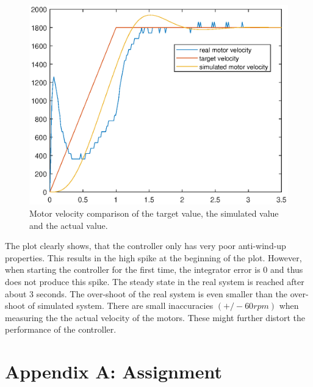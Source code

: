 \documentclass[a4paper,12pt,twoside]{scrreprt}
\begin{document}
\begin{figure}[H]
	\centering
	\includegraphics[width=\textwidth,height=\textheight,keepaspectratio]{../Controller/controllerComparison_Path.eps}
	\caption[Controller Comparison]{Motor velocity comparison of the target value, the simulated value and the actual value.}
	\label{fig:ContrllerComparison}
\end{figure}


The plot clearly shows, that the controller only has very poor anti-wind-up properties. This results in the high spike at the beginning of the plot. However, when starting the controller for the first time, the integrator error is 0 and thus does not produce this spike. The steady state in the real system is reached after about 3 seconds. The over-shoot of the real system is even smaller than the over-shoot of simulated system. There are small inaccuracies $(+/- 60rpm)$ when measuring the the actual velocity of the motors. These might further distort the performance of the controller.   


%
%

\chapter*{Appendix A: Assignment}  %
\label{chap:AppendixAAssignment}

\end{document}
